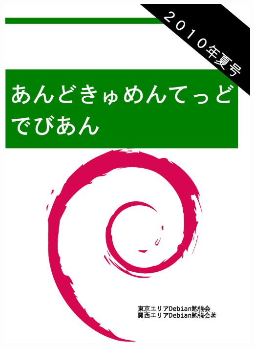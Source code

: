 \documentclass[mingoth,a4paper]{jsarticle}
\begin{document}
\begin{titlepage}
\includegraphics[height=252mm]{image2010-natsu/2010-summer.eps}
\end{titlepage}

\newpage
\thispagestyle{empty}\mbox{}
\newpage
\end{document}
